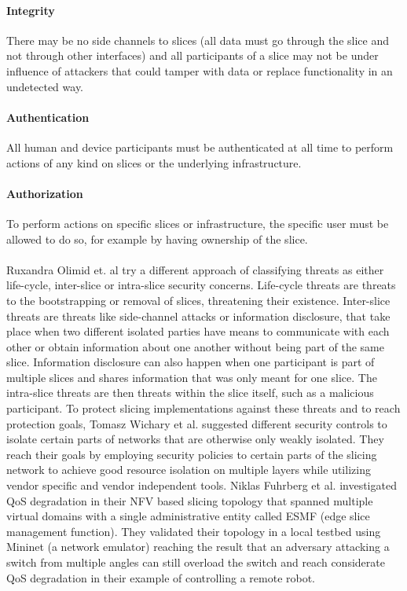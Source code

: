 \paragraph{Integrity} There may be no side channels to slices (all data must go through the slice and not through other interfaces) and all participants of a slice may not be under influence of attackers that could tamper with data or replace functionality in an undetected way.
\paragraph{Authentication} All human and device participants must be authenticated at all time to perform actions of any kind on slices or the underlying infrastructure.
\paragraph{Authorization} To perform actions on specific slices or infrastructure, the specific user must be allowed to do so, for example by having ownership of the slice.

\paragraph{}Ruxandra Olimid et. al \cite{SE2} try a different approach of classifying threats as either life-cycle, inter-slice or intra-slice security concerns. Life-cycle threats are threats to the bootstrapping or removal of slices, threatening their existence. Inter-slice threats are threats like side-channel attacks or information disclosure, that take place when two different isolated parties have means to communicate with each other or obtain information about one another without being part of the same slice. Information disclosure can also happen when one participant is part of multiple slices and shares information that was only meant for one slice. The intra-slice threats are then threats within the slice itself, such as a malicious participant.
To protect slicing implementations against these threats and to reach protection goals, Tomasz Wichary et al. \cite{SE3} suggested different security controls to isolate certain parts of networks that are otherwise only weakly isolated. They reach their goals by employing security policies to certain parts of the slicing network to achieve good resource isolation on multiple layers while utilizing vendor specific and vendor independent tools. Niklas Fuhrberg et al. \cite{SE4} investigated QoS degradation in their NFV based slicing topology that spanned multiple virtual domains with a single administrative entity called ESMF (edge slice management function). They validated their topology in a local testbed using Mininet \cite{mininet} (a network emulator) reaching the result that an adversary attacking a switch from multiple angles can still overload the switch and reach considerate QoS degradation in their example of controlling a remote robot.

